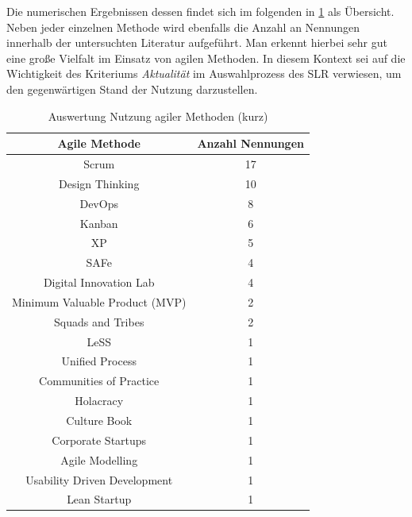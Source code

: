 
Die numerischen Ergebnissen dessen findet sich im folgenden in \ref{tab:clusteringagileshort} als Übersicht. Neben jeder einzelnen Methode wird ebenfalls die Anzahl an Nennungen innerhalb der untersuchten Literatur aufgeführt. Man erkennt hierbei sehr gut eine große Vielfalt im Einsatz von agilen Methoden. In diesem Kontext sei auf die Wichtigkeit des Kriteriums \textit{Aktualität} im Auswahlprozess des SLR verwiesen, um den gegenwärtigen Stand der Nutzung darzustellen.

\begin{table}[ht]
	\centering
	\caption{Auswertung Nutzung agiler Methoden (kurz)}
	\begin{tabular}{|c|c|}
		\hline
		\textbf{Agile Methode}& \textbf{Anzahl Nennungen} \\
		\hline
		Scrum                          & 17               \\
		Design Thinking                & 10               \\
		DevOps                         & 8                \\
		Kanban                         & 6                \\
		XP                             & 5                \\
		SAFe                           & 4                \\
		Digital Innovation Lab         & 4                \\
		Minimum Valuable Product (MVP) & 2                \\
		Squads and Tribes              & 2                \\
		LeSS                           & 1                \\
		Unified Process                & 1                \\
		Communities of Practice        & 1                \\
		Holacracy                      & 1                \\
		Culture Book                   & 1                \\
		Corporate Startups             & 1                \\
		Agile Modelling                & 1                \\
		Usability Driven Development   & 1                \\
		Lean Startup                   & 1               \\
		\hline
	\end{tabular}
	\label{tab:clusteringagileshort}
\end{table}

